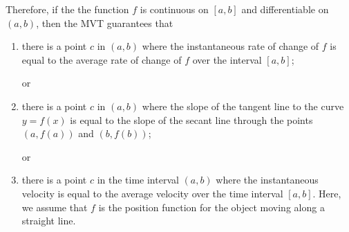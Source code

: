 \documentclass{ximera}
\begin{document}
Therefore, if the the function $f$ is continuous on $[a,b]$ and differentiable on $(a,b)$, then the MVT guarantees that
\begin{enumerate}
\item there is a point $c$ in $(a,b)$ where the instantaneous rate of change of $f$ is equal to the average rate of change of $f$ over the interval $[a,b]$;

or

\item there is a point $c$ in $(a,b)$ where the slope of the tangent line to the curve $y=f(x)$ is equal to the slope of the secant line through the points $(a,f(a))$  and $(b,f(b))$; 

or

\item there is a point $c$ in the time interval $(a,b)$ where the instantaneous velocity is equal to the average velocity over the time interval $[a,b]$. Here, we assume that $f$ is the position function for the object moving along a straight line.
\end{enumerate}
\end{document}
